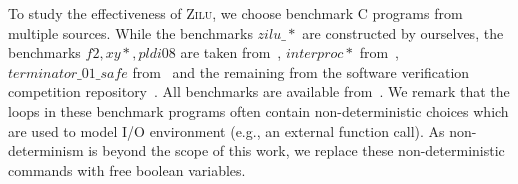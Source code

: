 To study the effectiveness of \textsc{Zilu}, we choose benchmark C programs from multiple sources.
While the benchmarks
 $\mathit{zilu\_*}$ are constructed by ourselves,
the benchmarks $\mathit{f2}, \mathit{xy*}, \mathit{pldi08}$ are taken from~\cite{gulwani2008program,sharma2012interpolants,gulavani2008automatically}, %
$\mathit{interproc*}$ from~\cite{jeannet2010interproc},
 $\mathit{terminator\_01\_safe}$ %
 from~\cite{beyer:SVCOMP:2013} and the remaining
from the software verification competition repository~\cite{Dirk:SVCOMP:2016}.  All benchmarks are available from~\cite{zilu:benchmark}.
We remark that the loops in these benchmark programs often contain non-deterministic choices
which are used to model I/O environment (e.g., an external function call).
As non-determinism is beyond the scope of this work, we replace these non-deterministic commands with free boolean variables. %

